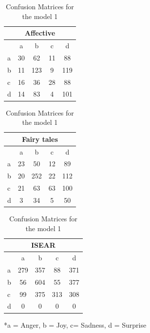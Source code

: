 \documentclass[
10pt, %
a4paper, %
oneside, %
headinclude,footinclude, %
BCOR5mm, %
]{scrartcl}
\begin{document}
\begin{table}[hbt]
            \footnotesize
                \begin{tabular}[t]{|l|c|c|c|c|}
                    \hline
                    \multicolumn{5}{|c|}{{Affective}} \\    
                    \hline
                    &a&b&c&d\\ \hline
                    a&30&62&11&88 \\ \hline
                    b&11&123&9&119\\ \hline
                    c&16&36&28&88 \\ \hline   
                    d&14&83&4&101\\ \hline
                \end{tabular}
                \hfill
                \begin{tabular}[t]{|l|c|c|c|c|}
                    \hline
                    \multicolumn{5}{|c|}{{Fairy tales}} \\    
                    \hline
                    &a&b&c&d\\ \hline
                    a&23&50&12&89 \\ \hline
                    b&20&252&22&112\\ \hline
                    c&21&63&63&100 \\ \hline   
                    d&3&34&5&50\\ \hline
                \end{tabular}
                \hfill
                \begin{tabular}[t]{|l|c|c|c|c|}
                    \hline
                    \multicolumn{5}{|c|}{{ISEAR}} \\    
                    \hline
                    &a&b&c&d\\ \hline
                    a&279&357&88&371 \\ \hline
                    b&56&604&55&377\\ \hline
                    c&99&375&313&308 \\ \hline   
                    d&0&0&0&0\\ \hline
                \end{tabular}
                \caption{Confusion Matrices for the model 1}
                \label{Confusion Matrices for the model 1}
                *a = Anger, b = Joy, c= Sadness, d = Surprise
            \end{table}
\end{document}
